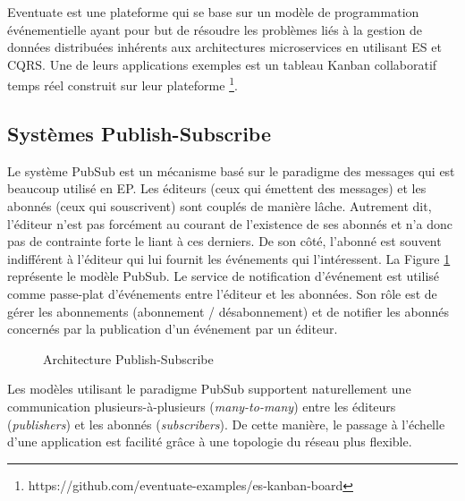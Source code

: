 Eventuate est une plateforme qui se base sur un modèle de programmation 
événementielle ayant pour but de résoudre les problèmes liés à la gestion de 
données distribuées inhérents aux architectures microservices en utilisant \gls{ES} et
\gls{CQRS}. Une de leurs applications exemples est un tableau Kanban collaboratif 
temps réel construit sur leur plateforme
\footnote{https://github.com/eventuate-examples/es-kanban-board}. 
	\subsection{Systèmes Publish-Subscribe}

Le système \gls{PubSub} est un mécanisme basé sur le 
paradigme des 
messages qui est beaucoup utilisé en \gls{EP}. 
Les éditeurs (ceux qui émettent des messages) et les abonnés 
(ceux qui souscrivent) sont couplés de manière lâche. 
Autrement dit, l'éditeur n'est pas forcément au courant de l'existence de 
ses abonnés et n'a donc pas de contrainte forte le liant à ces derniers. 
De son côté, l'abonné est souvent indifférent à l'éditeur qui lui 
fournit les événements qui l'intéressent. La Figure \ref{fig:pubsub} représente le 
modèle \gls{PubSub}.
Le service de notification d'événement est utilisé comme passe-plat d'événements 
entre l'éditeur et les abonnées. Son rôle est de gérer les abonnements 
(abonnement / désabonnement) et de notifier les abonnés concernés par la 
publication d'un événement par un éditeur.

\begin{figure}[ht!]
	\centering
	\caption{Architecture Publish-Subscribe}
	\label{fig:pubsub}
\end{figure}


Les modèles utilisant le paradigme \gls{PubSub} supportent naturellement une 
communication plusieurs-à-plusieurs (\textit{many-to-many}) 
entre les éditeurs (\textit{publishers}) et les abonnés (\textit{subscribers}).  
De cette manière, le passage à l'échelle d'une application est facilité 
grâce à une topologie du réseau plus flexible. 


